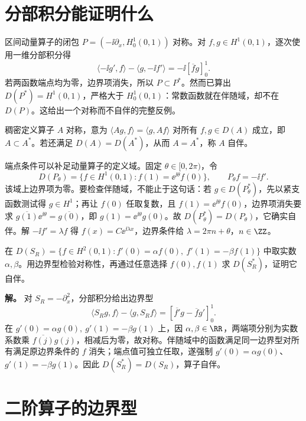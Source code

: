 \section{分部积分能证明什么}

区间动量算子的闭包 \(P=(-\ii\partial_x,H_0^1(0,1))\) 对称。对 \(f,g\in H^1(0,1)\)，逐次使用一维分部积分得
\[
\langle -\ii g',f\rangle-\langle g,-\ii f'\rangle
=-\ii[\overline f g]_0^1.
\]
若两函数端点均为零，边界项消失，所以 \(P\subset P^*\)。然而已算出 \(D(P^*)=H^1(0,1)\)，严格大于 \(H_0^1(0,1)\)：常数函数就在伴随域，却不在 \(D(P)\)。这给出一个对称而不自伴的完整反例。

\begin{definition}[对称与自伴]
稠密定义算子 \(A\) 对称，意为 \(\langle Ag,f\rangle=\langle g,Af\rangle\) 对所有 \(f,g\in D(A)\) 成立，即 \(A\subset A^*\)。若还满足 \(D(A)=D(A^*)\)，从而 \(A=A^*\)，称 \(A\) 自伴。
\end{definition}

端点条件可以补足动量算子的定义域。固定 \(\theta\in[0,2\pi)\)，令
\[
D(P_\theta)=\{f\in H^1(0,1):f(1)=\ee^{\ii\theta}f(0)\},
\qquad P_\theta f=-\ii f'.
\]
该域上边界项为零。要检查伴随域，不能止于这句话：若 \(g\in D(P_\theta^*)\)，先以紧支函数测试得 \(g\in H^1\)；再让 \(f(0)\) 任取复数，且 \(f(1)=\ee^{\ii\theta}f(0)\)，边界项消失要求 \(\overline{g(1)}\ee^{\ii\theta}=\overline{g(0)}\)，即 \(g(1)=\ee^{\ii\theta}g(0)\)。故 \(D(P_\theta^*)=D(P_\theta)\)，它确实自伴。解 \(-\ii f'=\lambda f\) 得 \(f(x)=C\ee^{\ii\lambda x}\)，边界条件给 \(\lambda=2\pi n+\theta\)，\(n\in\ZZ\)。


\par
\begin{workedexample}
在 \(D(S_R)=\{f\in H^2(0,1):f'(0)=\alpha f(0),\ f'(1)=-\beta f(1)\}\) 中取实数 \(\alpha,\beta\)。用边界型检验对称性，再通过任意选择 \(f(0),f(1)\) 求 \(D(S_R^*)\)，证明它自伴。


\textbf{解。} 对 \(S_R=-\partial_x^2\)，分部积分给出边界型
\[
\langle S_Rg,f\rangle-\langle g,S_Rf\rangle=[\overline{f'}g-\overline f g']_0^1.
\]
在 \(g'(0)=\alpha g(0),\ g'(1)=-\beta g(1)\) 上，因 \(\alpha,\beta\in\RR\)，两端项分别为实数系数乘 \(\overline{f(j)}g(j)\)，相减后为零，故对称。伴随域中的函数满足同一边界型对所有满足原边界条件的 \(f\) 消失；端点值可独立任取，遂强制 \(g'(0)=\alpha g(0)\)、\(g'(1)=-\beta g(1)\)。因此 \(D(S_R^*)=D(S_R)\)，算子自伴。
\end{workedexample}
\par
\section{二阶算子的边界型}

